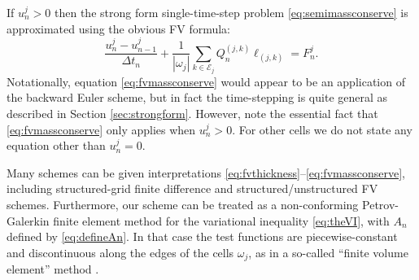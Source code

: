 \documentclass[final,onefignum]{siamart190516}
\begin{document}
If $u_n^j>0$ then the strong form single-time-step problem \eqref{eq:semimassconserve} is approximated using the obvious FV formula:
\begin{equation}
\frac{u_n^j - u_{n-1}^j}{\Delta t_n} + \frac{1}{|\omega_j|} \sum_{k\in \mathcal{E}_j} Q_n^{(j,k)} \ell_{(j,k)} = F_n^j. \label{eq:fvmassconserve}
\end{equation}
Notationally, equation \eqref{eq:fvmassconserve} would appear to be an application of the backward Euler scheme, but in fact the time-stepping is quite general as described in Section \ref{sec:strongform}.  However, note the essential fact that \eqref{eq:fvmassconserve} only applies when $u_n^j>0$.  For other cells we do not state any equation other than $u_n^j=0$.

Many schemes can be given interpretations \eqref{eq:fvthickness}--\eqref{eq:fvmassconserve}, including structured-grid finite difference \cite{Bueler2016} and structured/unstructured FV \cite{LeVeque2002} schemes.  Furthermore, our scheme can be treated as a non-conforming Petrov-Galerkin finite element method for the variational inequality \eqref{eq:theVI}, with $A_n$ defined by \eqref{eq:defineAn}.  In that case the test functions are piecewise-constant and discontinuous along the edges of the cells $\omega_j$, as in a so-called ``finite volume element'' method \cite{Bueler2016,Cai1990,EwingLinLin2002}.
\end{document}
